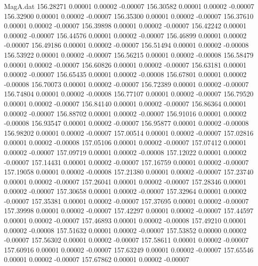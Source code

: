 \begin{filecontents}{MagA.dat}
 156.28271    0.00001    0.00002   -0.00007
 156.30582    0.00001    0.00002   -0.00007
 156.32900    0.00001    0.00002   -0.00007
 156.35300    0.00001    0.00002   -0.00007
 156.37610    0.00001    0.00002   -0.00007
 156.39898    0.00001    0.00002   -0.00007
 156.42242    0.00001    0.00002   -0.00007
 156.44576    0.00001    0.00002   -0.00007
 156.46899    0.00001    0.00002   -0.00007
 156.49186    0.00001    0.00002   -0.00007
 156.51494    0.00001    0.00002   -0.00008
 156.53922    0.00001    0.00002   -0.00007
 156.56215    0.00001    0.00002   -0.00008
 156.58479    0.00001    0.00002   -0.00007
 156.60826    0.00001    0.00002   -0.00007
 156.63181    0.00001    0.00002   -0.00007
 156.65435    0.00001    0.00002   -0.00008
 156.67801    0.00001    0.00002   -0.00008
 156.70073    0.00001    0.00002   -0.00007
 156.72389    0.00001    0.00002   -0.00007
 156.74804    0.00001    0.00002   -0.00008
 156.77107    0.00001    0.00002   -0.00007
 156.79520    0.00001    0.00002   -0.00007
 156.84140    0.00001    0.00002   -0.00007
 156.86364    0.00001    0.00002   -0.00007
 156.88702    0.00001    0.00002   -0.00007
 156.91016    0.00001    0.00002   -0.00008
 156.93547    0.00001    0.00002   -0.00007
 156.95877    0.00001    0.00002   -0.00008
 156.98202    0.00001    0.00002   -0.00007
 157.00514    0.00001    0.00002   -0.00007
 157.02816    0.00001    0.00002   -0.00008
 157.05106    0.00001    0.00002   -0.00007
 157.07412    0.00001    0.00002   -0.00007
 157.09719    0.00001    0.00002   -0.00008
 157.12022    0.00001    0.00002   -0.00007
 157.14431    0.00001    0.00002   -0.00007
 157.16759    0.00001    0.00002   -0.00007
 157.19058    0.00001    0.00002   -0.00008
 157.21380    0.00001    0.00002   -0.00007
 157.23740    0.00001    0.00002   -0.00007
 157.26041    0.00001    0.00002   -0.00007
 157.28346    0.00001    0.00002   -0.00007
 157.30658    0.00001    0.00002   -0.00007
 157.32964    0.00001    0.00002   -0.00007
 157.35381    0.00001    0.00002   -0.00007
 157.37695    0.00001    0.00002   -0.00007
 157.39998    0.00001    0.00002   -0.00007
 157.42297    0.00001    0.00002   -0.00007
 157.44597    0.00001    0.00002   -0.00007
 157.46893    0.00001    0.00002   -0.00008
 157.49210    0.00001    0.00002   -0.00008
 157.51632    0.00001    0.00002   -0.00007
 157.53852    0.00000    0.00002   -0.00007
 157.56302    0.00001    0.00002   -0.00007
 157.58611    0.00001    0.00002   -0.00007
 157.60916    0.00001    0.00002   -0.00007
 157.63249    0.00001    0.00002   -0.00007
 157.65546    0.00001    0.00002   -0.00007
 157.67862    0.00001    0.00002   -0.00007

\end{filecontents}
